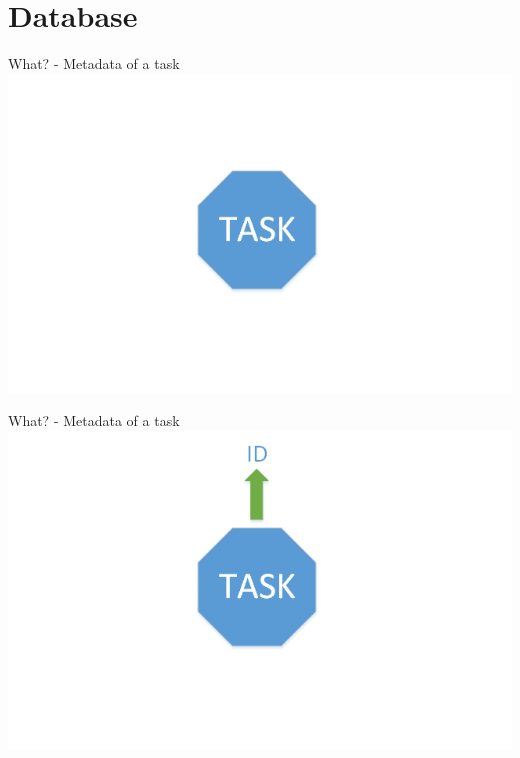 \section{Database}


	\begin{frame}{What? - Metadata of a task}
	\includegraphics[width=1.0\textwidth]{images/Task/zeichnungstep5.png}
	\end{frame}
	
	\begin{frame}{What? - Metadata of a task}
	\includegraphics[width=1.0\textwidth]{images/Task/zeichnungstep4.png}
	\end{frame}
	
